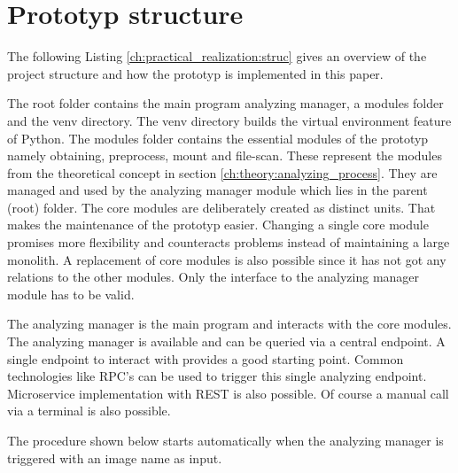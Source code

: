 \section{Prototyp structure}
\label{ch:practical_realization:prot_struct}
The following Listing \ref{ch:practical_realization:struc} gives an overview of the project structure and how the prototyp is implemented in this paper.

The root folder contains the main program analyzing manager, a modules folder and the venv directory.
The venv directory builds the virtual environment feature of Python. 
The modules folder contains the essential modules of the prototyp namely obtaining, preprocess, mount and file-scan.
These represent the modules from the theoretical concept in section \ref{ch:theory:analyzing_process}.
They are managed and used by the analyzing manager module which lies in the parent (root) folder. 
The core modules are deliberately created as distinct units. 
That makes the maintenance of the prototyp easier. 
Changing a single core module promises more flexibility and counteracts problems instead of maintaining a large monolith. 
A replacement of core modules is also possible since it has not got any relations to the other modules. 
Only the interface to the analyzing manager module has to be valid.

The analyzing manager is the main program and interacts with the core modules. 
The analyzing manager is available and can be queried via a central endpoint.
A single endpoint to interact with provides a good starting point. 
Common technologies like RPC's can be used to trigger this single analyzing endpoint. 
Microservice implementation with REST is also possible.
Of course a manual call via a terminal is also possible.

The procedure shown below starts automatically when the analyzing manager is triggered with an image name as input.

